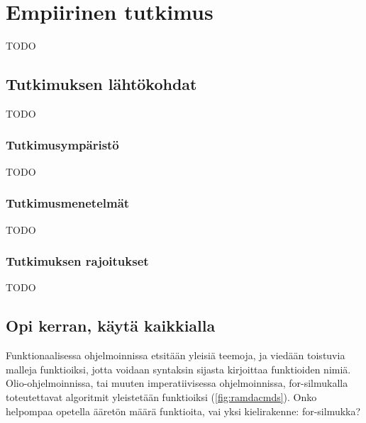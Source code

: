 \vspace{21.5pt}
\chapter{Empiirinen tutkimus}

TODO

\section{Tutkimuksen lähtökohdat}

TODO

\subsection{Tutkimusympäristö}

TODO

\subsection{Tutkimusmenetelmät}

TODO

\subsection{Tutkimuksen rajoitukset}

TODO


\section{Opi kerran, käytä kaikkialla}

Funktionaalisessa ohjelmoinnissa etsitään yleisiä teemoja, ja viedään toistuvia malleja funktioiksi, jotta voidaan syntaksin sijasta kirjoittaa funktioiden nimiä. Olio-ohjelmoinnissa, tai muuten imperatiivisessa ohjelmoinnissa, for-silmukalla toteutettavat algoritmit yleistetään funktioiksi (\ref{fig:ramdacmds}). Onko helpompaa opetella ääretön määrä funktioita, vai yksi kielirakenne: for-silmukka?

